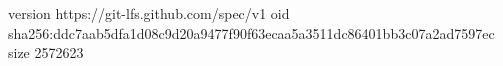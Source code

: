 version https://git-lfs.github.com/spec/v1
oid sha256:ddc7aab5dfa1d08c9d20a9477f90f63ecaa5a3511dc86401bb3c07a2ad7597ec
size 2572623
